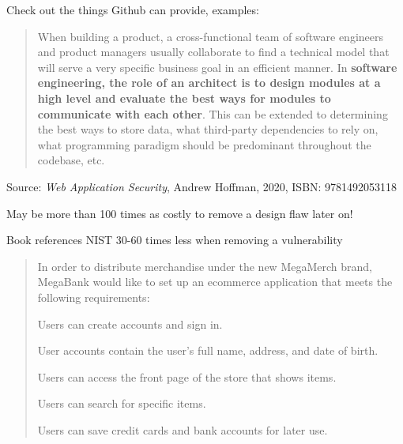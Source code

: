 \documentclass[Screen16to9,17pt]{foils}
\begin{document}
Check out the things Github can provide, examples:
\begin{list2}
\item {}
\item {}
\item {}
\item {}
\end{list2}






\begin{quote}
When building a product, a cross-functional team of software engineers and product managers usually collaborate to find a technical model that will serve a very specific business goal in an efficient manner. In {\bf software engineering, the role of an architect is to design modules at a high level and evaluate the best ways for modules to communicate with each other}. This can be extended to determining the best ways to store data, what third-party dependencies to rely on, what programming paradigm should be predominant throughout the codebase, etc.
\end{quote}
Source: \emph{Web Application Security}, Andrew Hoffman, 2020, ISBN: 9781492053118

\begin{list2}
\item May be more than 100 times as costly to remove a design flaw later on!
\item Book references NIST 30-60 times less when removing a vulnerability
\end{list2}



\begin{quote}

In order to distribute merchandise under the new MegaMerch brand, MegaBank
would like to set up an ecommerce application that meets the following requirements:
\begin{list2}
\item Users can create accounts and sign in.
\item User accounts contain the user’s full name, address, and date of birth.
\item Users can access the front page of the store that shows items.
\item Users can search for specific items.
\item Users can save credit cards and bank accounts for later use.
\end{list2}
\end{quote}
\end{document}
